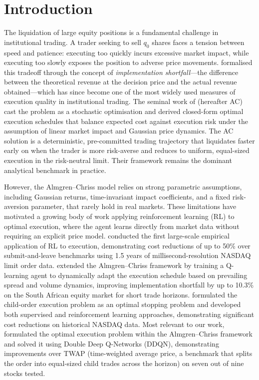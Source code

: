 \documentclass[11pt]{article}
\begin{document}

\section{Introduction}\label{sec:introduction}
 
The liquidation of large equity positions is a fundamental challenge in institutional trading. A trader seeking to sell $q_0$ shares faces a tension between speed and patience: executing too quickly incurs excessive market impact, while executing too slowly exposes the position to adverse price movements. \citet{perold1988implementation} formalised this tradeoff through the concept of \emph{implementation shortfall}---the difference between the theoretical revenue at the decision price and the actual revenue obtained---which has since become one of the most widely used measures of execution quality in institutional trading. The seminal work of \citet{almgren2001optimal} (hereafter AC) cast the problem as a stochastic optimisation and derived closed-form optimal execution schedules that balance expected cost against execution risk under the assumption of linear market impact and Gaussian price dynamics. The AC solution is a deterministic, pre-committed trading trajectory that liquidates faster early on when the trader is more risk-averse and reduces to uniform, equal-sized execution in the risk-neutral limit. Their framework remains the dominant analytical benchmark in practice.
 
However, the Almgren--Chriss model relies on strong parametric assumptions, including Gaussian returns, time-invariant impact coefficients, and a fixed risk-aversion parameter, that rarely hold in real markets. These limitations have motivated a growing body of work applying reinforcement learning (RL) to optimal execution, where the agent learns directly from market data without requiring an explicit price model. \citet{nevmyvaka2006reinforcement} conducted the first large-scale empirical application of RL to execution, demonstrating cost reductions of up to 50\% over submit-and-leave benchmarks using 1.5 years of millisecond-resolution NASDAQ limit order data. \citet{hendricks2014reinforcement} extended the Almgren--Chriss framework by training a Q-learning agent to dynamically adapt the execution schedule based on prevailing spread and volume dynamics, improving implementation shortfall by up to 10.3\% on the South African equity market for short trade horizons. \citet{moallemi2022reinforcement} formulated the child-order execution problem as an optimal stopping problem and developed both supervised and reinforcement learning approaches, demonstrating significant cost reductions on historical NASDAQ data. Most relevant to our work, \citet{ning2021double} formulated the optimal execution problem within the Almgren--Chriss framework and solved it using Double Deep Q-Networks (DDQN), demonstrating improvements over TWAP (time-weighted average price, a benchmark that splits the order into equal-sized child trades across the horizon) on seven out of nine stocks tested.
 
\end{document}
